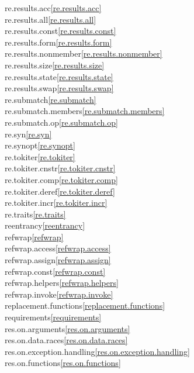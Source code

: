 \begin{multicols}{2}
re.results.acc\quad\ref{re.results.acc}\\
re.results.all\quad\ref{re.results.all}\\
re.results.const\quad\ref{re.results.const}\\
re.results.form\quad\ref{re.results.form}\\
re.results.nonmember\quad\ref{re.results.nonmember}\\
re.results.size\quad\ref{re.results.size}\\
re.results.state\quad\ref{re.results.state}\\
re.results.swap\quad\ref{re.results.swap}\\
re.submatch\quad\ref{re.submatch}\\
re.submatch.members\quad\ref{re.submatch.members}\\
re.submatch.op\quad\ref{re.submatch.op}\\
re.syn\quad\ref{re.syn}\\
re.synopt\quad\ref{re.synopt}\\
re.tokiter\quad\ref{re.tokiter}\\
re.tokiter.cnstr\quad\ref{re.tokiter.cnstr}\\
re.tokiter.comp\quad\ref{re.tokiter.comp}\\
re.tokiter.deref\quad\ref{re.tokiter.deref}\\
re.tokiter.incr\quad\ref{re.tokiter.incr}\\
re.traits\quad\ref{re.traits}\\
reentrancy\quad\ref{reentrancy}\\
refwrap\quad\ref{refwrap}\\
refwrap.access\quad\ref{refwrap.access}\\
refwrap.assign\quad\ref{refwrap.assign}\\
refwrap.const\quad\ref{refwrap.const}\\
refwrap.helpers\quad\ref{refwrap.helpers}\\
refwrap.invoke\quad\ref{refwrap.invoke}\\
replacement.functions\quad\ref{replacement.functions}\\
requirements\quad\ref{requirements}\\
res.on.arguments\quad\ref{res.on.arguments}\\
res.on.data.races\quad\ref{res.on.data.races}\\
res.on.exception.handling\quad\ref{res.on.exception.handling}\\
res.on.functions\quad\ref{res.on.functions}\\

\end{multicols}
